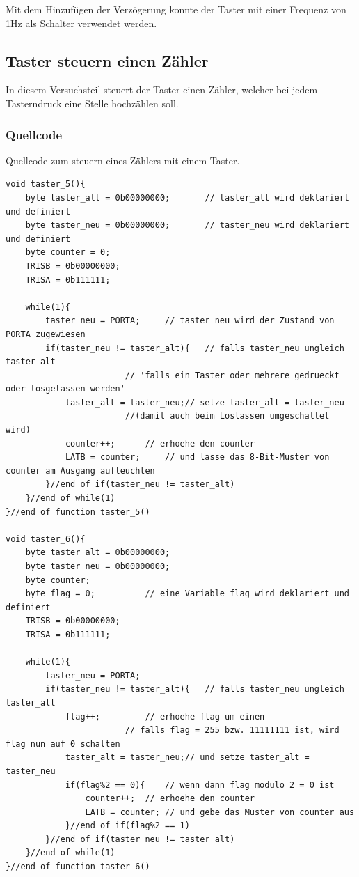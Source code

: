 \documentclass[12pt,a4paper]{article}
\begin{document}
Mit dem Hinzufügen der Verzögerung konnte der Taster mit einer Frequenz von 1Hz als Schalter verwendet werden.

\subsection{Taster steuern einen Zähler}

In diesem Versuchsteil steuert der Taster einen Zähler, welcher bei jedem Tasterndruck eine Stelle hochzählen soll.

\subsubsection*{Quellcode}

Quellcode zum steuern eines Zählers mit einem Taster.

\lstset{language=C, basicstyle=\tiny}
\begin{lstlisting}[caption = {Code zum stuern eines Zählers mit einem Schalter}, label=lst:g_9,captionpos=b]
void taster_5(){
	byte taster_alt = 0b00000000;		// taster_alt wird deklariert und definiert
	byte taster_neu = 0b00000000;		// taster_neu wird deklariert und definiert
	byte counter = 0;
	TRISB = 0b00000000;
	TRISA = 0b111111;
	
	while(1){
		taster_neu = PORTA;		// taster_neu wird der Zustand von PORTA zugewiesen
		if(taster_neu != taster_alt){	// falls taster_neu ungleich taster_alt 
						// 'falls ein Taster oder mehrere gedrueckt oder losgelassen werden'
			taster_alt = taster_neu;// setze taster_alt = taster_neu  
						//(damit auch beim Loslassen umgeschaltet wird)
			counter++;		// erhoehe den counter
			LATB = counter;		// und lasse das 8-Bit-Muster von counter am Ausgang aufleuchten
		}//end of if(taster_neu != taster_alt)
	}//end of while(1)
}//end of function taster_5()

void taster_6(){
	byte taster_alt = 0b00000000;
	byte taster_neu = 0b00000000;
	byte counter;
	byte flag = 0;			// eine Variable flag wird deklariert und definiert
	TRISB = 0b00000000;
	TRISA = 0b111111;
	
	while(1){
		taster_neu = PORTA;
		if(taster_neu != taster_alt){	// falls taster_neu ungleich taster_alt
			flag++;			// erhoehe flag um einen 
						// falls flag = 255 bzw. 11111111 ist, wird flag nun auf 0 schalten
			taster_alt = taster_neu;// und setze taster_alt = taster_neu
			if(flag%2 == 0){	// wenn dann flag modulo 2 = 0 ist
				counter++;	// erhoehe den counter
				LATB = counter;	// und gebe das Muster von counter aus
			}//end of if(flag%2 == 1)
		}//end of if(taster_neu != taster_alt)
	}//end of while(1)
}//end of function taster_6()
\end{lstlisting}
\end{document}
